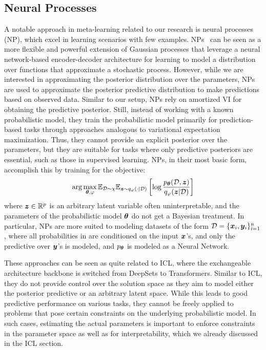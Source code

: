 \subsection{Neural Processes}
A notable approach in meta-learning related to our research is neural processes (NP), which excel in learning scenarios with few examples. 
NPs~\citep{garnelo2018conditional,garnelo2018neural,kim2019attentive,pakman2020neural,gordon2019convolutional} can be seen as a more flexible and powerful extension of Gaussian processes that leverage a neural network-based encoder-decoder architecture for learning to model a distribution over functions that approximate a stochastic process.
However, while we are interested in approximating the posterior distribution over the parameters, NPs are used to approximate the posterior predictive distribution to make predictions based on observed data. Similar to our setup, NPs rely on amortized VI for obtaining the predictive posterior. Still, instead of working with a known probabilistic model, they train the probabilistic model primarily for prediction-based tasks through approaches analogous to variational expectation maximization. Thus, they cannot provide an explicit posterior over the parameters, but they are suitable for tasks where only predictive posteriors are essential, such as those in supervised learning. NPs, in their most basic form, accomplish this by training for the objective:
\begin{align}
    \label{eq:np}
    \arg\max_{{\bm{\theta}}, \varphi} {\mathbb{E}}_{{\mathcal{D}} \sim \chi}{\mathbb{E}}_{{\bm{z}} \sim q_\varphi(\cdot | {\mathcal{D}})}\left[\log \frac{p_{\bm{\theta}}({\mathcal{D}}, {\bm{z}})}{q_\varphi({\bm{z}} | {\mathcal{D}})}\right]
\end{align}
where ${\bm{z}} \in {\mathbb{R}}^p$ is an arbitrary latent variable often uninterpretable, and the parameters of the probabilistic model ${\bm{\theta}}$ do not get a Bayesian treatment. In particular, NPs are more suited to modeling datasets of the form ${\mathcal{D}} = \{{\bm{x}}_i, {\bm{y}}_i\}_{i=1}^n$, where all probabilities in  are conditioned on the input ${\bm{x}}$'s, and only the predictive over ${\bm{y}}$'s is modeled, and $p_{\bm{\theta}}$ is modeled as a Neural Network.

These approaches can be seen as quite related to ICL, where the exchangeable architecture backbone is switched from DeepSets to Transformers. Similar to ICL, they do not provide control over the solution space as they aim to model either the posterior predictive or an arbitrary latent space. While this leads to good predictive performance on various tasks, they cannot be freely applied to problems that pose certain constraints on the underlying probabilistic model. In such cases, estimating the actual parameters is important to enforce constraints in the parameter space as well as for interpretability, which we already discussed in the ICL section.

